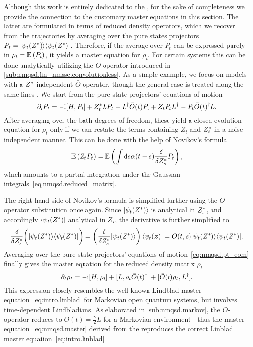 Although this work is entirely dedicated to the \NMSSE, for the sake of completeness we provide the connection to the customary master equations in this section.
The latter are formulated in terms of reduced density operators, which we recover from the trajectories by averaging over the pure states projectors $P_t = | \psi_t({Z}^*) \rangle\langle \psi_t({Z}^*) |$.
Therefore, if the average over $\dot P_t$ can be expressed purely in $\rho_t = \E[P_t]$, it yields a master equation for $\rho_t$.
For certain systems this can be done analytically utilizing the $O$-operator introduced in \autoref{sub:nmqsd.lin_nmsse.convolutionless}.
As a simple example, we focus on models with a ${Z}^*$ independent $\bar O$-operator, though the general case is treated along the same lines \cite{YuDiGiSt99_pertubation,YuDiGi00_master}.
We start from the pure-state projectors' equations of motion
\begin{equation}
  \partial_t P_t = -\mathrm{i} [H, P_t] + {Z}^*_t L P_t - L^\dagger\bar O(t)P_t + Z_t P_t L^\dagger - P_t \bar O(t)^\dagger L.
  \label{eq:nmqsd.pt_eom}
\end{equation}
After averaging over the bath degrees of freedom, these yield a closed evolution equation for $\rho_t$ only if we can restate the terms containing $Z_t$ and ${Z}^*_t$ in a noise-independent manner.
This can be done with the help of Novikov's formula \cite{No65_functionals}
\begin{equation}
  \E[Z_t P_t] = \E[\intdd s \alpha(t - s) \frac{\delta}{\delta \ZZ_s} P_t],
  \label{eq:nmqsd.novikov}
\end{equation}
which amounts to a partial integration under the Gaussian integrals~\ref{eq:nmqsd.reduced_matrix}.

The right hand side of Novikov's formula is simplified further using the $O$-operator substitution once again.
Since $| \psi_t({Z}^*) \rangle$ is analytical in ${Z}^*_s$, and accordingly $\langle \psi_t({Z}^*) |$ analytical in $Z_s$, the derivative is further simplified to
\begin{equation*}
  \frac{\delta}{\delta {Z}^*_s} \bigg( | \psi_t({Z}^*) \rangle\langle \psi_t({Z}^*) | \bigg) = \left( \frac{\delta}{\delta {Z}^*_s} | \psi_t({Z}^*) \rangle \right)\langle \psi_t(\boldsymbol{z}) | = O(t, s) | \psi_t({Z}^*) \rangle\langle \psi_t({Z}^*) |.
\end{equation*}
Averaging over the pure state projectors' equations of motion~\ref{eq:nmqsd.pt_eom} finally gives the master equation for the reduced density matrix $\rho_t$
\begin{equation}
  \partial_t \rho_t = -\mathrm{i} [H, \rho_t]  +  [L, \rho_t \bar O(t)^\dagger]  +  [\bar O(t) \rho_t, L^\dagger].
  \label{eq:nmqsd.master}
\end{equation}
This expression closely resembles the well-known Lindblad master equation~\ref{eq:intro.linblad} for Markovian open quantum systems, but involves time-dependent Lindbladians.
As elaborated in \autoref{sub:nmqsd.markov}, the $\bar O$-operator reduces to $\bar O(t) = \frac{\gamma}{2} L$ for a Markovian environment---thus the master equation~\ref{eq:nmqsd.master} derived from the \NMSSE reproduces the correct Linblad master equation~\ref{eq:intro.linblad}.


